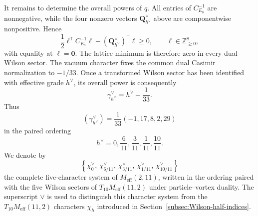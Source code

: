 \documentclass[11pt,a4paper]{article}
\numberwithin{equation}{section}
\begin{document}
It remains to determine the overall powers of $q$.  All entries of $C_{E_8}^{-1}$ are nonnegative, while the four nonzero vectors $\boldsymbol Q_{h^\vee}^\vee$ above are componentwise nonpositive.  Hence
\begin{equation}
  \frac12\boldsymbol\ell^{\mathsf T}C_{E_8}^{-1}\boldsymbol\ell
  -(\boldsymbol Q_{h^\vee}^\vee)^{\mathsf T}\boldsymbol\ell
  \geq0,
  \qquad
  \boldsymbol\ell\in\mathbb Z_{\geq0}^{8},
\end{equation}
with equality at $\boldsymbol\ell=\boldsymbol0$.  The lattice minimum is therefore zero in every dual Wilson sector.  The vacuum character fixes the common dual Casimir normalization to $-1/33$.  Once a transformed Wilson sector has been identified with effective grade $h^\vee$, its overall power is consequently
\begin{equation}
  \gamma_{h^\vee}^\vee
  =h^\vee-\frac1{33}.
  \label{eq:dual-Wilson-normalization}
\end{equation}
Thus
\begin{equation}
  \left(\gamma_{h^\vee}^\vee\right)
  =\frac1{33}(-1,17,8,2,29)
\end{equation}
in the paired ordering
\begin{equation}
  h^\vee=0,\frac6{11},\frac3{11},\frac1{11},\frac{10}{11}.
\end{equation}
We denote by
\begin{equation}
  \left\{
  \chi_0^\vee,\,
  \chi_{6/11}^\vee,\,
  \chi_{3/11}^\vee,\,
  \chi_{1/11}^\vee,\,
  \chi_{10/11}^\vee
  \right\}
  \label{eq:dual-complete-character-system}
\end{equation}
the complete five-character system of $M_{\mathrm{eff}}(2,11)$, written in the ordering paired with the five Wilson sectors of $T_{10}M_{\mathrm{eff}}(11,2)$ under particle--vortex duality.  The superscript $\vee$ is used to distinguish this character system from the $T_{10}M_{\mathrm{eff}}(11,2)$ characters $\chi_h$ introduced in Section~\ref{subsec:Wilson-half-indices}.
\end{document}
